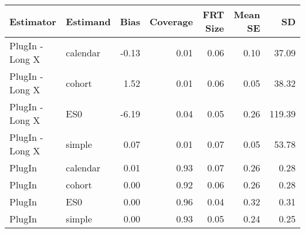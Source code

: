\captionsetup[table]{labelformat=empty,skip=1pt}
\begin{longtable}{llrrrrr}
\toprule
Estimator & Estimand & Bias & Coverage & FRT Size & Mean SE & SD \\ 
\midrule
PlugIn - Long X & calendar & -0.13 & 0.01 & 0.06 & 0.10 & 37.09 \\ 
PlugIn - Long X & cohort & 1.52 & 0.01 & 0.06 & 0.05 & 38.32 \\ 
PlugIn - Long X & ES0 & -6.19 & 0.04 & 0.05 & 0.26 & 119.39 \\ 
PlugIn - Long X & simple & 0.07 & 0.01 & 0.07 & 0.05 & 53.78 \\ 
PlugIn & calendar & 0.01 & 0.93 & 0.07 & 0.26 & 0.28 \\ 
PlugIn & cohort & 0.00 & 0.92 & 0.06 & 0.26 & 0.28 \\ 
PlugIn & ES0 & 0.00 & 0.96 & 0.04 & 0.32 & 0.31 \\ 
PlugIn & simple & 0.00 & 0.93 & 0.05 & 0.24 & 0.25 \\ 
 \bottomrule
\end{longtable}

